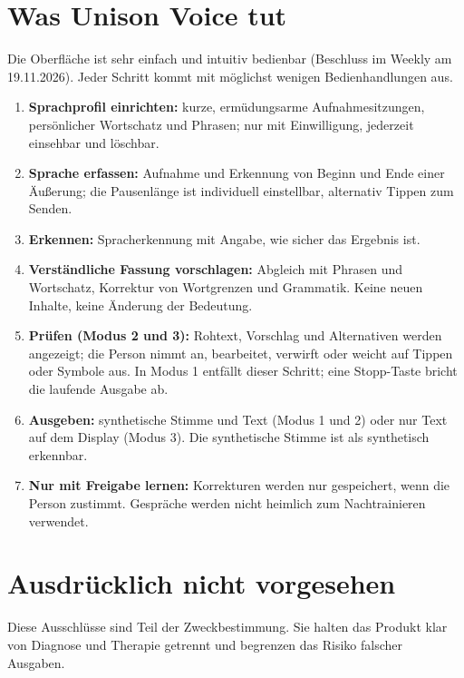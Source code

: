 \documentclass[a4paper]{article}
\begin{document}
\section{Was Unison Voice tut}

Die Oberfläche ist sehr einfach und intuitiv bedienbar (Beschluss im Weekly am 19.11.2026). Jeder Schritt kommt mit möglichst wenigen Bedienhandlungen aus.

\begin{enumerate}
\item \textbf{Sprachprofil einrichten:} kurze, ermüdungsarme Aufnahmesitzungen, persönlicher Wortschatz und Phrasen; nur mit Einwilligung, jederzeit einsehbar und löschbar.
\item \textbf{Sprache erfassen:} Aufnahme und Erkennung von Beginn und Ende einer Äußerung; die Pausenlänge ist individuell einstellbar, alternativ Tippen zum Senden.
\item \textbf{Erkennen:} Spracherkennung mit Angabe, wie sicher das Ergebnis ist.
\item \textbf{Verständliche Fassung vorschlagen:} Abgleich mit Phrasen und Wortschatz, Korrektur von Wortgrenzen und Grammatik. Keine neuen Inhalte, keine Änderung der Bedeutung.
\item \textbf{Prüfen (Modus 2 und 3):} Rohtext, Vorschlag und Alternativen werden angezeigt; die Person nimmt an, bearbeitet, verwirft oder weicht auf Tippen oder Symbole aus. In Modus 1 entfällt dieser Schritt; eine Stopp-Taste bricht die laufende Ausgabe ab.
\item \textbf{Ausgeben:} synthetische Stimme und Text (Modus 1 und 2) oder nur Text auf dem Display (Modus 3). Die synthetische Stimme ist als synthetisch erkennbar.
\item \textbf{Nur mit Freigabe lernen:} Korrekturen werden nur gespeichert, wenn die Person zustimmt. Gespräche werden nicht heimlich zum Nachtrainieren verwendet.
\end{enumerate}

\section{Ausdrücklich nicht vorgesehen}

Diese Ausschlüsse sind Teil der Zweckbestimmung. Sie halten das Produkt klar von Diagnose und Therapie getrennt und begrenzen das Risiko falscher Ausgaben.
\end{document}
